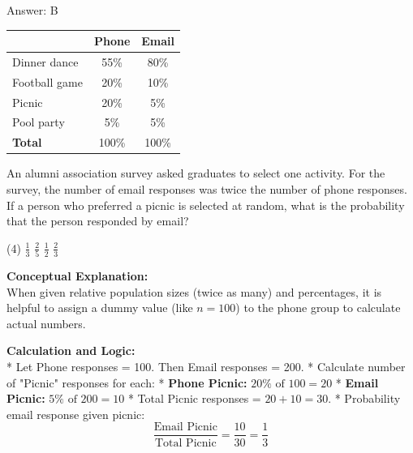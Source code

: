 \documentclass[11pt,paper=a4,answers]{exam}
\begin{document}
\begin{questions}
\begin{solution}
\vspace{30pt}

Answer: \colorbox{yellow!100}{B}
\end{solution}

\vspace{60pt}

\question
\begin{center}
\begin{tabular}{|l|c|c|}
\hline
 & \textbf{Phone} & \textbf{Email} \\ \hline
Dinner dance & 55\% & 80\% \\ \hline
Football game & 20\% & 10\% \\ \hline
Picnic & 20\% & 5\% \\ \hline
Pool party & 5\% & 5\% \\ \hline
\textbf{Total} & 100\% & 100\% \\ \hline
\end{tabular}
\end{center}
An alumni association survey asked graduates to select one activity. For the survey, the number of email responses was twice the number of phone responses. If a person who preferred a picnic is selected at random, what is the probability that the person responded by email?
\begin{tasks}(4)
    \task $\frac{1}{3}$
    \task $\frac{2}{5}$
    \task $\frac{1}{2}$
    \task $\frac{2}{3}$
\end{tasks}

\begin{solution}
\textbf{Conceptual Explanation:} \\
When given relative population sizes (twice as many) and percentages, it is helpful to assign a dummy value (like $n=100$) to the phone group to calculate actual numbers.

\vspace{30pt}

\textbf{Calculation and Logic:} \\
* Let Phone responses = 100. Then Email responses = 200.
* Calculate number of "Picnic" responses for each:
    * \textbf{Phone Picnic:} $20\% \text{ of } 100 = 20$
    * \textbf{Email Picnic:} $5\% \text{ of } 200 = 10$
* Total Picnic responses = $20 + 10 = 30$.
* Probability email response given picnic:
\[ \frac{\text{Email Picnic}}{\text{Total Picnic}} = \frac{10}{30} = \frac{1}{3} \]

\vspace{30pt}


\end{solution}
\end{questions}
\end{document}

